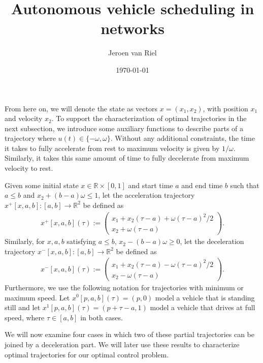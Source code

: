 \documentclass[a4paper]{article}
\author{Jeroen van Riel}
\date{\monthyeardate\today}
\title{Autonomous vehicle scheduling in networks}
\theoremstyle{definition}
\theoremstyle{plain}
\begin{document}
\maketitle

\tableofcontents
\newpage

\newcommand\halfopen[2]{\ensuremath{[#1,#2)}}
\newcommand\openhalf[2]{\ensuremath{(#1,#2]}}


From here on, we will denote the state as vectors $x = (x_{1}, x_{2})$, with
position $x_{1}$ and velocity $x_{2}$. To support the characterization of
optimal trajectories in the next subsection, we introduce some auxiliary
functions to describe parts of a trajectory where
$u(t) \in \{-\omega, \omega\}$. Without any additional constraints, the time it
takes to fully accelerate from rest to maximum velocity is given by $1/\omega$.
Similarly, it takes this same amount of time to fully decelerate from maximum
velocity to rest.

Given some initial state $x \in \mathbb{R} \times [0, 1]$ and start time $a$ and
end time $b$ such that $a \leq b$ and $x_{2} + (b - a) \omega \leq 1$, let the
acceleration trajectory $x^{+}[x, a, b] : [a, b] \rightarrow \mathbb{R}^{2}$ be
defined as
\begin{align*}
  x^{+}[x, a, b](\tau) :=
  \begin{pmatrix}
  x_{1} + x_{2}(\tau - a) + \omega (\tau-a)^{2} / 2 \\
  x_{2} + \omega (\tau - a)
  \end{pmatrix} .
\end{align*}
Similarly, for $x, a, b$ satisfying $a \leq b$, $x_{2} - (b-a)\omega \geq 0$, let the deceleration trajectory $x^{-}[x, a, b] : [a, b] \rightarrow \mathbb{R}^{2}$ be defined as
\begin{align*}
  x^{-}[x, a, b](\tau) :=
  \begin{pmatrix}
  x_{1} + x_{2}(\tau - a) - \omega (\tau - a)^{2} / 2 \\
  x_{2} - \omega (\tau - a)
  \end{pmatrix} .
\end{align*}
Furthermore, we use the following notation for trajectories with minimum or
maximum speed. Let $x^{0}[p, a, b](\tau) = (p, 0)$ model a vehicle that is
standing still and let $x^{1}[p, a, b](\tau) = (p + \tau - a, 1)$ model a
vehicle that drives at full speed, where $\tau \in [a,b]$ in both cases.

We will now examine four cases in which two of these partial trajectories can be
joined by a deceleration part. We will later use these results to characterize
optimal trajectories for our optimal control problem.
\end{document}
